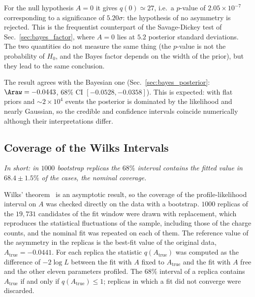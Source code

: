 For the null hypothesis $A=0$ it gives $q(0)\simeq27$, i.e.\ a $p$-value of $2.05\times10^{-7}$ corresponding to a significance of $5.20\sigma$: the hypothesis of no asymmetry is rejected. This is the frequentist counterpart of the Savage-Dickey test of Sec.~\ref{sec:bayes_factor}, where $A=0$ lies at $5.2$ posterior standard deviations.%
The two quantities do not measure the same thing (the $p$-value is not the probability of $H_0$, and the Bayes factor depends on the width of the prior), but they lead to the same conclusion.

The result agrees with the Bayesian one (Sec.~\ref{sec:bayes_posterior}: $\Araw=-0.0443$, $68\%$ CI $[-0.0528,-0.0358]$). This is expected: with flat priors and $\sim2\times10^4$ events the posterior is dominated by the likelihood and nearly Gaussian, so the credible and confidence intervals coincide numerically although their interpretations differ.

\subsection{Coverage of the Wilks Intervals}
\label{sec:freq_coverage}
\emph{In short: in $1000$ bootstrap replicas the $68\%$ interval contains the fitted value in $68.4\pm1.5\%$ of the cases, the nominal coverage.}

Wilks' theorem~\cite{wilks} is an asymptotic result, so the coverage of the profile-likelihood interval on $A$ was checked directly on the data with a bootstrap. $1000$ replicas of the $19{,}731$ candidates of the fit window were drawn with replacement, which reproduces the statistical fluctuations of the sample, including those of the charge counts, and the nominal fit was repeated on each of them. The reference value of the asymmetry in the replicas is the best-fit value of the original data, $A_{\mathrm{true}}=-0.0441$. For each replica the statistic $q(A_{\mathrm{true}})$ was computed as the difference of $-2\log L$ between the fit with $A$ fixed to $A_{\mathrm{true}}$ and the fit with $A$ free and the other eleven parameters profiled. The $68\%$ interval of a replica contains $A_{\mathrm{true}}$ if and only if $q(A_{\mathrm{true}})\leq1$; replicas in which a fit did not converge were discarded.


